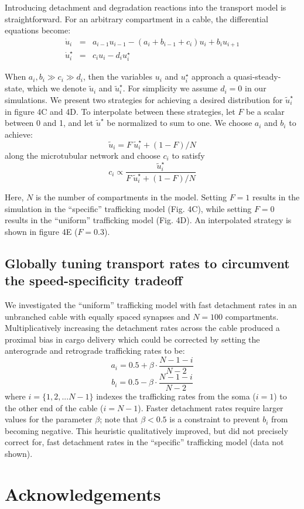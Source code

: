 \documentclass[11pt]{wlpeerj}
\begin{document}
Introducing detachment and degradation reactions into the transport model is straightforward. For an arbitrary compartment in a cable, the differential equations become:
$$
\begin{array}{lcl}
\dot{u}_i & = & a_{i-1} u_{i-1} - (a_i+b_{i-1}+c_i) u_i + b_i u_{i+1} \\
\dot{u}_i^\star & = & c_i u_i - d_i u_i^\star
\end{array}
$$

When $a_i,b_i \gg c_i \gg d_i$, then the variables $u_i$ and $u_i^\star$ approach a quasi-steady-state, which we denote $\tilde{u}_i$ and $\tilde{u}_i^\star$. For simplicity we assume $d_i = 0$ in our simulations. We present two strategies for achieving a desired distribution for $\tilde{u}_i^\star$ in figure 4C and 4D. To interpolate between these strategies, let $F$ be a scalar between 0 and 1, and let $\tilde{u}^\star$ be normalized to sum to one. We choose $a_i$ and $b_i$ to achieve:
$$
\tilde{u}_i = F~\tilde{u}_i^\star + (1-F)/N 
$$
along the microtubular network and choose $c_i$ to satisfy
$$
c_i \propto \frac{\tilde{u}_i^\star}{F~\tilde{u}_i^\star + (1-F)/N} 
$$

Here, $N$ is the number of compartments in the model. Setting $F=1$ results in the simulation in the ``specific'' trafficking model (Fig. 4C), while setting $F=0$ results in the ``uniform'' trafficking model (Fig. 4D). An interpolated strategy is shown in figure 4E ($F=0.3$).

\subsection*{Globally tuning transport rates to circumvent the speed-specificity tradeoff}

We investigated the ``uniform'' trafficking model with fast detachment rates in an unbranched cable with equally spaced synapses and $N = 100$ compartments. Multiplicatively increasing the detachment rates across the cable produced a proximal bias in cargo delivery which could be corrected by setting the anterograde and retrograde trafficking rates to be:
$$
a_i = 0.5 + \beta \cdot \frac{N-1-i}{N-2}
$$
$$
b_i = 0.5 - \beta \cdot \frac{N-1-i}{N-2}
$$
where $i = \{1,2,...N-1\}$ indexes the trafficking rates from the soma ($i=1$) to the other end of the cable ($i=N-1$). Faster detachment rates require larger values for the parameter $\beta$; note that $\beta < 0.5$ is a constraint to prevent $b_i$ from becoming negative. This heuristic qualitatively improved, but did not precisely correct for, fast detachment rates in the ``specific'' trafficking model (data not shown). 

\section*{Acknowledgements}


\end{document}
